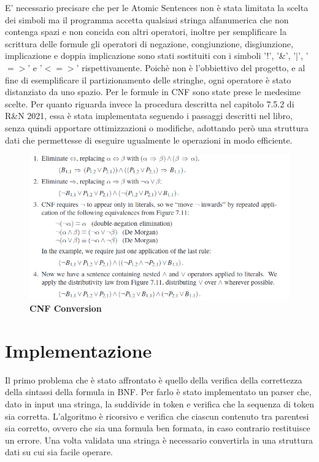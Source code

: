 \documentclass{article} %
\begin{document}
E' necessario precisare che per le Atomic Sentences non è stata limitata la scelta dei simboli ma il programma accetta qualsiasi stringa alfanumerica che non contenga spazi e non concida con altri operatori, inoltre per semplificare la scrittura delle formule gli operatori di negazione, congiunzione, disgiunzione, implicazione e doppia implicazione sono stati sostituiti con i simboli '!', '\&', '$|$', '$=>$' e '$<=>$' rispettivamente.
Poichè non è l'obbiettivo del progetto, e al fine di esemplificare il partizionamento delle stringhe, ogni operatore è stato distanziato da uno spazio.
Per le formule in CNF sono state prese le medesime scelte. 
Per quanto riguarda invece la procedura descritta nel capitolo 7.5.2 di R\&N 2021, essa è stata implementata seguendo i passaggi descritti nel libro, senza quindi apportare ottimizzazioni o modifiche, adottando però una struttura dati che permettesse di eseguire ugualmente le operazioni in modo efficiente.

\begin{figure}[htbp]
    \caption{\textbf{CNF Conversion}}
    \centering
    \includegraphics[width=\linewidth]{cnf}
\end{figure}


\section*{Implementazione}  

Il primo problema che è stato affrontato è quello della verifica della correttezza della sintassi della formula in BNF. Per farlo è stato implementato un parser che, dato in input una stringa, la suddivide in token e verifica che la sequenza di token sia corretta.
L'algoritmo è ricorsivo e verifica che ciascun contenuto tra parentesi sia corretto, ovvero che sia una formula ben formata, in caso contrario restituisce un errore.
Una volta validata una stringa è necessario convertirla in una struttura dati su cui sia facile operare. 
\end{document}
